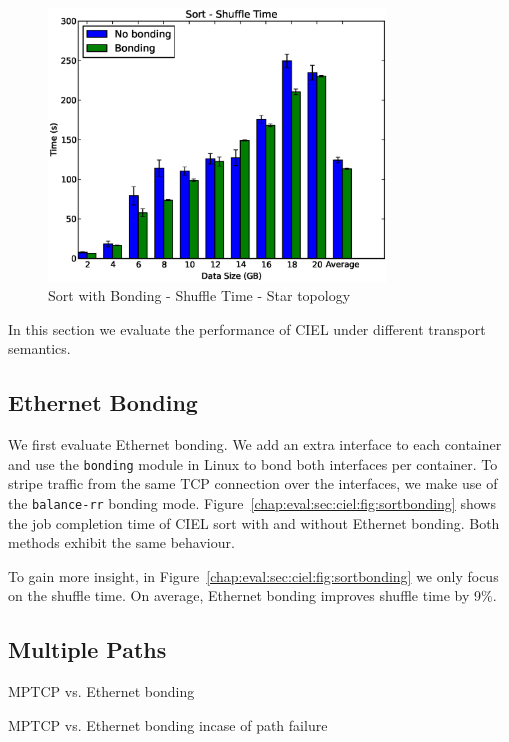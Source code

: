 \documentclass[a4paper,12pt,twoside,openright]{report}
\begin{document}
\begin{figure}[h!]
  \centering
    \includegraphics[width=0.8\textwidth]{shuffle_bonding_no_bonding.eps}
    \caption{Sort with Bonding - Shuffle Time - Star topology}
    \label{chap:eval:sec:ciel:fig:sortshuffle}
\end{figure}

In this section we evaluate the performance of CIEL under different transport
semantics.

\subsection{Ethernet Bonding}
We first evaluate Ethernet bonding. We add an extra interface to each container
and use the \texttt{bonding} module in Linux to bond both interfaces per
container. To stripe traffic from the same TCP connection over the interfaces,
we make use of the \texttt{balance-rr} bonding mode.
Figure~\ref{chap:eval:sec:ciel:fig:sortbonding} shows the job completion time of
CIEL sort with and without Ethernet bonding. Both methods exhibit the same
behaviour.

To gain more insight, in Figure~\ref{chap:eval:sec:ciel:fig:sortbonding} we only
focus on the shuffle time. On average, Ethernet bonding improves shuffle time
by 9\%.

\subsection{Multiple Paths}
MPTCP vs. Ethernet bonding

MPTCP vs. Ethernet bonding incase of path failure
\end{document}
